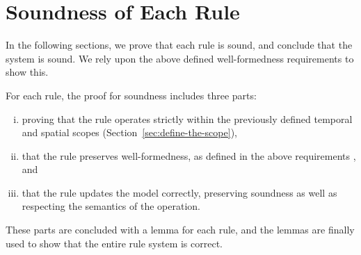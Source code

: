 \section{Soundness of Each Rule}
\label{sec:soundness-of-each-rule}
In the following sections, we prove that each rule is sound, and conclude that the system is sound. We rely upon the above defined well-formedness requirements  to show this.

For each rule, the proof for soundness includes three parts: 
\begin{enumerate}[(i)]
   \item proving that the rule operates strictly within the previously defined temporal and spatial scopes (Section~\vref{sec:define-the-scope}), 
   \item that the rule preserves well-formedness, as defined in the above requirements , and
   \item that the rule updates the model correctly, preserving soundness as well as respecting the semantics of the operation.
\end{enumerate}

These parts are concluded with a lemma for each rule, and the lemmas are finally used to show that the entire rule system is correct.
